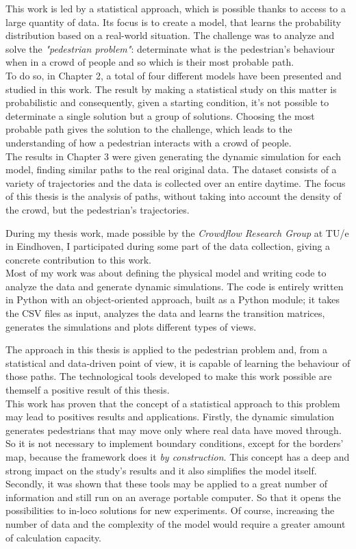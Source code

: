 \documentclass[class=article, crop=false]{standalone}
\begin{document}

This work is led by a statistical approach, which is possible thanks to access to a large quantity of data.
Its focus is to create a model, that learns the probability distribution based on a real-world situation.
The challenge was to analyze and solve the \emph{"pedestrian problem"}: determinate what is the pedestrian's behaviour when in a crowd of people and so which is their most probable path.
\\To do so, in Chapter 2, a total of four different models have been presented and studied in this work.
The result by making a statistical study on this matter is probabilistic and consequently, given a starting condition, it's not possible to determinate a single solution but a group of solutions.
Choosing the most probable path gives the solution to the challenge, which leads to the understanding of how a pedestrian interacts with a crowd of people.
\\The results in Chapter 3 were given generating the dynamic simulation for each model, finding similar paths to the real original data.
The dataset consists of a variety of trajectories and the data is collected over an entire daytime.
The focus of this thesis is the analysis of paths, without taking into account the density of the crowd, but the pedestrian's trajectories.

During my thesis work, made possible by the \emph{Crowdflow Research Group} at TU/e in Eindhoven, I participated during some part of the data collection, giving a concrete contribution to this work.
\\Most of my work was about defining the physical model and writing code \cite{repoPIA} to analyze the data and generate dynamic simulations.
The code is entirely written in Python with an object-oriented approach, built as a Python module;
it takes the CSV files as input, analyzes the data and learns the transition matrices, generates the simulations and plots different types of views.

The approach in this thesis is applied to the pedestrian problem and, from a statistical and data-driven point of view, it is capable of learning the behaviour of those paths.
The technological tools developed to make this work possible are themself a positive result of this thesis.
\\This work has proven that the concept of a statistical approach to this problem may lead to positives results and applications.
Firstly, the dynamic simulation generates pedestrians that may move only where real data have moved through.
So it is not necessary to implement boundary conditions, except for the borders' map, because the framework does it \emph{by construction}.
This concept has a deep and strong impact on the study's results and it also simplifies the model itself.
Secondly, it was shown that these tools may be applied to a great number of information and still run on an average portable computer.
So that it opens the possibilities to in-loco solutions for new experiments.
Of course, increasing the number of data and the complexity of the model would require a greater amount of calculation capacity.
\end{document}
